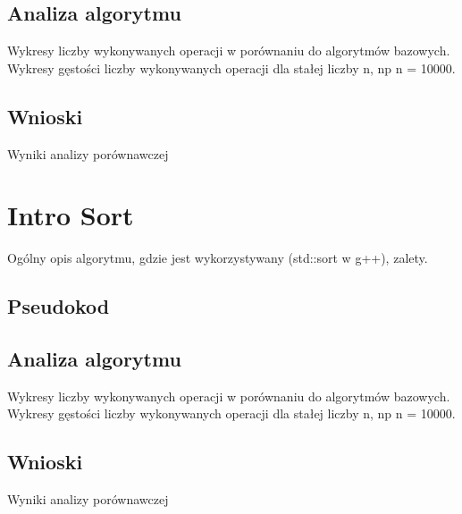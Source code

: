 \subsection{Analiza algorytmu}
Wykresy liczby wykonywanych operacji w porównaniu do algorytmów bazowych.
Wykresy gęstości liczby wykonywanych operacji dla stałej liczby n, np n = 10000.

\subsection{Wnioski}
Wyniki analizy porównawczej


\section{Intro Sort}
Ogólny opis algorytmu, gdzie jest wykorzystywany (std::sort w g++), zalety.

\subsection{Pseudokod}

\subsection{Analiza algorytmu}
Wykresy liczby wykonywanych operacji w porównaniu do algorytmów bazowych.
Wykresy gęstości liczby wykonywanych operacji dla stałej liczby n, np n = 10000.

\subsection{Wnioski}
Wyniki analizy porównawczej



